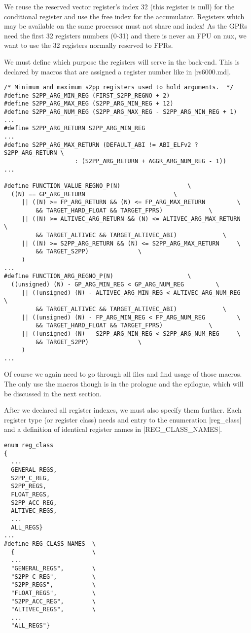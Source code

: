 We reuse the reserved vector register's index 32 (this register is null) for the conditional register and use the free index for the accumulator.
Registers which may be available on the same processor must not share and index!
As the GPRs need the first 32 registers numbers (0-31) and there is never an FPU on nux, we want to use the 32 registers normally reserved to FPRs.

We must define which purpose the registers will serve in the back-end.
This is declared by macros that are assigned a register number like in |rs6000.md|.
\begin{lstlisting}
/* Minimum and maximum s2pp registers used to hold arguments.  */
#define S2PP_ARG_MIN_REG (FIRST_S2PP_REGNO + 2)
#define S2PP_ARG_MAX_REG (S2PP_ARG_MIN_REG + 12)
#define S2PP_ARG_NUM_REG (S2PP_ARG_MAX_REG - S2PP_ARG_MIN_REG + 1)
...
#define S2PP_ARG_RETURN S2PP_ARG_MIN_REG
...
#define S2PP_ARG_MAX_RETURN (DEFAULT_ABI != ABI_ELFv2 ? S2PP_ARG_RETURN \
                    : (S2PP_ARG_RETURN + AGGR_ARG_NUM_REG - 1))
...

#define FUNCTION_VALUE_REGNO_P(N)                   \
  ((N) == GP_ARG_RETURN                         \
     || ((N) >= FP_ARG_RETURN && (N) <= FP_ARG_MAX_RETURN         \
         && TARGET_HARD_FLOAT && TARGET_FPRS)             \
     || ((N) >= ALTIVEC_ARG_RETURN && (N) <= ALTIVEC_ARG_MAX_RETURN   \
         && TARGET_ALTIVEC && TARGET_ALTIVEC_ABI)             \
     || ((N) >= S2PP_ARG_RETURN && (N) <= S2PP_ARG_MAX_RETURN     \
         && TARGET_S2PP)              \
     )
...
#define FUNCTION_ARG_REGNO_P(N)                     \
  ((unsigned) (N) - GP_ARG_MIN_REG < GP_ARG_NUM_REG         \
     || ((unsigned) (N) - ALTIVEC_ARG_MIN_REG < ALTIVEC_ARG_NUM_REG   \
         && TARGET_ALTIVEC && TARGET_ALTIVEC_ABI)             \
     || ((unsigned) (N) - FP_ARG_MIN_REG < FP_ARG_NUM_REG         \
         && TARGET_HARD_FLOAT && TARGET_FPRS)             \
     || ((unsigned) (N) - S2PP_ARG_MIN_REG < S2PP_ARG_NUM_REG     \
         && TARGET_S2PP)              \
     )
...
\end{lstlisting}

Of course we again need to go through all files and find usage of those macros.
The only use the macros though is in the prologue and the epilogue, which will be discussed in the next section.

After we declared all register indexes, we must also specify them further.
Each register type (or register class) needs and entry to the enumeration |reg_class| and a definition of identical register names in |REG_CLASS_NAMES|.
\begin{lstlisting}[multicols=2]
enum reg_class
{
  ...
  GENERAL_REGS,
  S2PP_C_REG,
  S2PP_REGS,
  FLOAT_REGS,
  S2PP_ACC_REG,
  ALTIVEC_REGS,
  ...
  ALL_REGS}
...
#define REG_CLASS_NAMES  \
  {                      \
  ...
  "GENERAL_REGS",        \
  "S2PP_C_REG",          \
  "S2PP_REGS",           \
  "FLOAT_REGS",          \
  "S2PP_ACC_REG",        \
  "ALTIVEC_REGS",        \
  ...
  "ALL_REGS"}
  \end{lstlisting}

